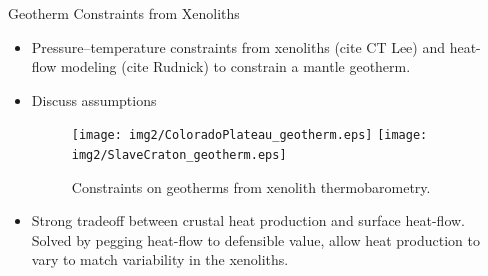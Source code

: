 \documentclass[final]{beamer}
\newlength{\onecolwid}
\newlength{\twocolwid}
\begin{document}
\begin{frame}[t]
\begin{columns}[t]
\begin{column}{\twocolwid}
\begin{columns}[t,totalwidth=\twocolwid] %

\begin{column}{\onecolwid}\vspace{-.6in} %


\begin{block}{Geotherm Constraints from Xenoliths}

\begin{itemize}

\item Pressure--temperature constraints from xenoliths (cite CT Lee) and heat-flow modeling (cite Rudnick) to constrain a mantle geotherm.

\item Discuss assumptions

\begin{figure}
\texttt{[image: img2/ColoradoPlateau\_geotherm.eps]}
\texttt{[image: img2/SlaveCraton\_geotherm.eps]}
\caption{Constraints on geotherms from xenolith thermobarometry.}
\end{figure}

\item Strong tradeoff between crustal heat production and surface heat-flow.  Solved by pegging heat-flow to defensible value, allow heat production to vary to match variability in the xenoliths.

\end{itemize}

\end{block}


\end{column} %

\begin{column}{\onecolwid}\vspace{-.6in} %



\end{column}
\end{columns}
\end{column}
\end{columns}
\end{frame}
\end{document}
